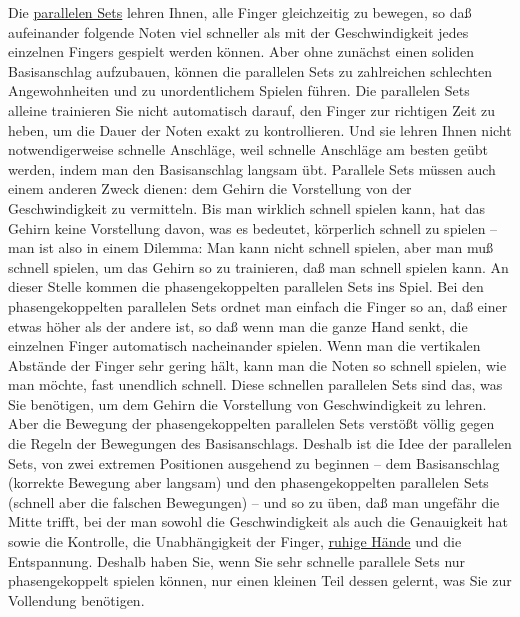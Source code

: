 Die \hyperref[c1ii11]{parallelen Sets} lehren Ihnen, alle Finger gleichzeitig zu bewegen, so daß aufeinander folgende Noten viel schneller als mit der Geschwindigkeit jedes einzelnen Fingers gespielt werden können.
Aber ohne zunächst einen soliden Basisanschlag aufzubauen, können die parallelen Sets zu zahlreichen schlechten Angewohnheiten und zu unordentlichem Spielen führen.
Die parallelen Sets alleine trainieren Sie nicht automatisch darauf, den Finger zur richtigen Zeit zu heben, um die Dauer der Noten exakt zu kontrollieren.
Und sie lehren Ihnen nicht notwendigerweise schnelle Anschläge, weil schnelle Anschläge am besten geübt werden, indem man den Basisanschlag langsam übt.
Parallele Sets müssen auch einem anderen Zweck dienen: dem Gehirn die Vorstellung von der Geschwindigkeit zu vermitteln.
Bis man wirklich schnell spielen kann, hat das Gehirn keine Vorstellung davon, was es bedeutet, körperlich schnell zu spielen -- man ist also in einem Dilemma: Man kann nicht schnell spielen, aber man muß schnell spielen, um das Gehirn so zu trainieren, daß man schnell spielen kann.
An dieser Stelle kommen die phasengekoppelten parallelen Sets ins Spiel.
Bei den phasengekoppelten parallelen Sets ordnet man einfach die Finger so an, daß einer etwas höher als der andere ist, so daß wenn man die ganze Hand senkt, die einzelnen Finger automatisch nacheinander spielen.
Wenn man die vertikalen Abstände der Finger sehr gering hält, kann man die Noten so schnell spielen, wie man möchte, fast unendlich schnell.
Diese schnellen parallelen Sets sind das, was Sie benötigen, um dem Gehirn die Vorstellung von Geschwindigkeit zu lehren.
Aber die Bewegung der phasengekoppelten parallelen Sets verstößt völlig gegen die Regeln der Bewegungen des Basisanschlags.
Deshalb ist die Idee der parallelen Sets, von zwei extremen Positionen ausgehend zu beginnen -- dem Basisanschlag (korrekte Bewegung aber langsam) und den phasengekoppelten parallelen Sets (schnell aber die falschen Bewegungen) -- und so zu üben, daß man ungefähr die Mitte trifft, bei der man sowohl die Geschwindigkeit als auch die Genauigkeit hat sowie die Kontrolle, die Unabhängigkeit der Finger, \hyperref[ruhig]{ruhige Hände} und die Entspannung.
Deshalb haben Sie, wenn Sie sehr schnelle parallele Sets nur phasengekoppelt spielen können, nur einen kleinen Teil dessen gelernt, was Sie zur Vollendung benötigen.

